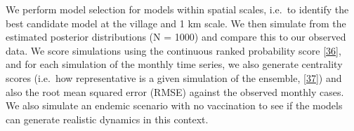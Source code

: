 \documentclass[
  oneside]{book}
\begin{document}
We perform model selection for models within spatial scales, i.e.~to identify the best candidate model at the village and 1 km scale. We then simulate from the estimated posterior distributions (N = 1000) and compare this to our observed data. We score simulations using the continuous ranked probability score \protect\hyperlink{ref-jordan2019}{{[}36{]}}, and for each simulation of the monthly time series, we also generate centrality scores (i.e.~how representative is a given simulation of the ensemble, \protect\hyperlink{ref-juul2020}{{[}37{]}}) and also the root mean squared error (RMSE) against the observed monthly cases. We also simulate an endemic scenario with no vaccination to see if the models can generate realistic dynamics in this context.

\begin{table}


\end{table}
\end{document}
